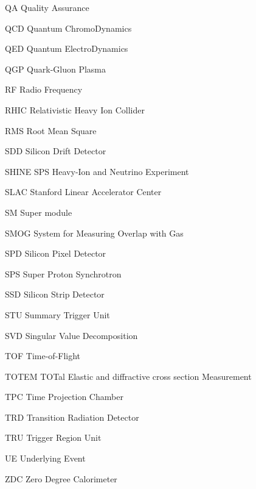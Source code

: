 \begin{abbrv}
\item[QA]				Quality Assurance
\item[QCD]			Quantum ChromoDynamics
\item[QED]			Quantum ElectroDynamics
\item[QGP]			Quark-Gluon Plasma
 

\item[RF]				Radio Frequency
\item[RHIC]			Relativistic Heavy Ion Collider
\item[RMS]			Root Mean Square

\item[SDD]			Silicon Drift Detector
\item[SHINE]			SPS Heavy-Ion and Neutrino Experiment
\item[SLAC]			Stanford Linear Accelerator Center
\item[SM]				Super module
\item[SMOG]			System for Measuring Overlap with Gas

\item[SPD]			Silicon Pixel Detector
\item[SPS]			Super Proton Synchrotron
\item[SSD]			Silicon Strip Detector
\item[STU]			Summary Trigger Unit
\item[SVD]			Singular Value Decomposition


\item[TOF]			Time-of-Flight
\item[TOTEM]			 TOTal Elastic and diffractive cross section Measurement
\item[TPC]			Time Projection Chamber
\item[TRD]			Transition Radiation Detector 
\item[TRU]			Trigger Region Unit

\item[UE]				Underlying Event

\item[ZDC]			Zero Degree Calorimeter
\end{abbrv}


